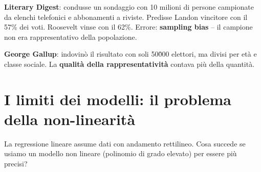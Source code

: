 \begin{exbox}
\textbf{Literary Digest}: condusse un sondaggio con 10 milioni di persone campionate da elenchi telefonici e abbonamenti a riviste. Predisse Landon vincitore con il 57\% dei voti. Roosevelt vinse con il 62\%. Errore: \textbf{sampling bias} -- il campione non era rappresentativo della popolazione.

\textbf{George Gallup}: indovinò il risultato con soli 50\.000 elettori, ma divisi  per età e classe sociale. La \textbf{qualità della rappresentatività} contava più della quantità.
\end{exbox}

\section{I limiti dei modelli: il problema della non-linearità}
La regressione lineare assume dati con andamento rettilineo. Cosa succede se usiamo un modello non lineare (polinomio di grado elevato) per essere più precisi?

